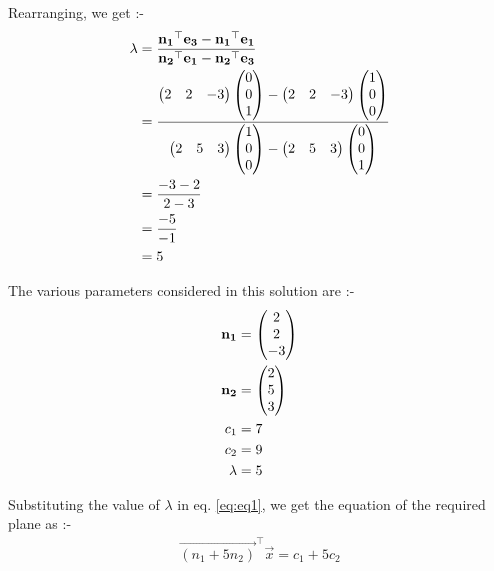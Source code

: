 \documentclass[journal,12pt,twocolumn]{IEEEtran}
\renewcommand\thesection{\arabic{section}}
\begin{document}
\begin{enumerate}[label=\thesection.\arabic*.,ref=\thesection.\theenumi]
Rearranging, we get :-
\begin{align}
\lambda &= \frac{\mathbf{n_1}^{\top}\mathbf{e_3} - \mathbf{n_1}^{\top}\mathbf{e_1}}{\mathbf{n_2}^{\top}\mathbf{e_1} - \mathbf{n_2}^{\top}\mathbf{e_3}} \label{eq:eq3} \\
&= \frac{\begin{pmatrix}2 & 2 & -3\end{pmatrix}\begin{pmatrix}0 \\ 0 \\ 1\end{pmatrix} - \begin{pmatrix}2 & 2 & -3\end{pmatrix}\begin{pmatrix}1 \\ 0 \\ 0\end{pmatrix}}{\begin{pmatrix}2 & 5 & 3\end{pmatrix}\begin{pmatrix}1 \\ 0 \\ 0\end{pmatrix} - \begin{pmatrix}2 & 5 & 3\end{pmatrix}\begin{pmatrix}0 \\ 0 \\ 1\end{pmatrix}} \\
&= \frac{-3 - 2}{2 - 3} \\
&= \frac{-5}{-1} \\
&= 5
\end{align}

The various parameters considered in this solution are :-
\begin{align}
\mathbf{n_1} &= \begin{pmatrix}2 \\ 2 \\ -3\end{pmatrix}
\\
\mathbf{n_2} &= \begin{pmatrix}2 \\ 5 \\ 3\end{pmatrix}
\\
c_1 &= 7
\\
c_2 &= 9
\\
\lambda &= 5
\end{align}

Substituting the value of $\lambda$ in eq. \eqref{eq:eq1}, we get the equation of the required plane as :-
\begin{align}
\vec{\left( n_1 + 5 n_2 \right)}^{\top}\vec{x} = c_1 + 5 c_2
\end{align}


\end{enumerate}
\end{document}
